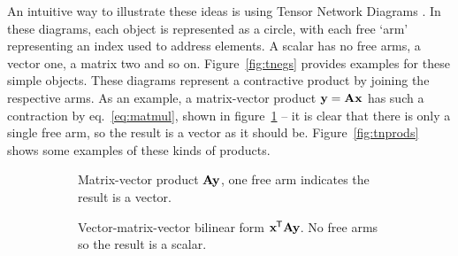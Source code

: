 An intuitive way to illustrate these ideas is using Tensor Network Diagrams
\autocite{Cichocki2016, Orus2014}. In these diagrams, each object is represented
as a circle, with each free `arm' representing an index used to address elements.
A scalar has no free arms, a vector one, a matrix two and so on.
Figure~\ref{fig:tnegs} provides examples for these simple objects. 
These diagrams represent a contractive product by joining the
respective arms. As an example, a matrix-vector product \(\mathbf{y} = \mathbf{Ax}\)
has such a contraction by eq.~\eqref{eq:matmul}, shown in
figure~\ref{fig:tnmatvec} -- it is clear that there is only a single free arm, so the
result is a vector as it should be. Figure~\ref{fig:tnprods} shows some examples
of these kinds of products.

\begin{figure}
	\centering
	\begin{subfigure}[t]{0.45\textwidth}
		\centering
		\caption{Matrix-vector product \(\mathbf{A}\mathbf{y}\), one free arm indicates
		 the result is a vector.}
		 \label{fig:tnmatvec}
	\end{subfigure} \hfill
	\begin{subfigure}[t]{0.45\textwidth}
		\centering
		\caption{Vector-matrix-vector bilinear form \(\mathbf{x}^{\mkern-1.5mu\mathsf{T}}\mathbf{A}
				 \mathbf{y}\). No free arms so the result is a scalar.}
	\end{subfigure}\\
	\begin{subfigure}[t]{0.45\textwidth}
		\centering
\end{subfigure}
\end{figure}
